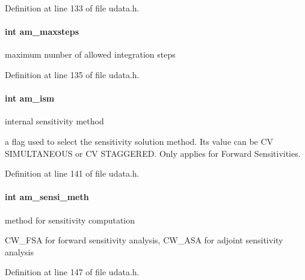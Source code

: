 Definition at line 133 of file udata.\+h.

\hypertarget{struct_user_data_a0187950731c16f2857d0cd5b92416352}{}
\paragraph[{am\+\_\+maxsteps}]{\setlength{\rightskip}{0pt plus 5cm}int am\+\_\+maxsteps}\label{struct_user_data_a0187950731c16f2857d0cd5b92416352}
maximum number of allowed integration steps 

Definition at line 135 of file udata.\+h.

\hypertarget{struct_user_data_a1f2514c0ee00da61ade386173b718a02}{}
\paragraph[{am\+\_\+ism}]{\setlength{\rightskip}{0pt plus 5cm}int am\+\_\+ism}\label{struct_user_data_a1f2514c0ee00da61ade386173b718a02}
internal sensitivity method

a flag used to select the sensitivity solution method. Its value can be C\+V S\+I\+M\+U\+L\+T\+A\+N\+E\+O\+U\+S or C\+V S\+T\+A\+G\+G\+E\+R\+E\+D. Only applies for Forward Sensitivities. 

Definition at line 141 of file udata.\+h.

\hypertarget{struct_user_data_a83bc6716ecf3decb3d963929361fcd6d}{}
\paragraph[{am\+\_\+sensi\+\_\+meth}]{\setlength{\rightskip}{0pt plus 5cm}int am\+\_\+sensi\+\_\+meth}\label{struct_user_data_a83bc6716ecf3decb3d963929361fcd6d}
method for sensitivity computation

C\+W\+\_\+\+F\+S\+A for forward sensitivity analysis, C\+W\+\_\+\+A\+S\+A for adjoint sensitivity analysis 

Definition at line 147 of file udata.\+h.

\hypertarget{struct_user_data_a03fa52449ab4bb9a1a75312fd9064db1}{}
